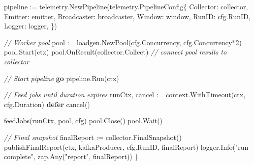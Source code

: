 \documentclass[
]{article}
\newenvironment{Shaded}{}{}
\newcommand{\CommentTok}[1]{\textcolor[rgb]{0.38,0.63,0.69}{\textit{#1}}}
\newcommand{\ControlFlowTok}[1]{\textcolor[rgb]{0.00,0.44,0.13}{\textbf{#1}}}
\newcommand{\DecValTok}[1]{\textcolor[rgb]{0.25,0.63,0.44}{#1}}
\newcommand{\NormalTok}[1]{#1}
\newcommand{\OperatorTok}[1]{\textcolor[rgb]{0.40,0.40,0.40}{#1}}
\newcommand{\StringTok}[1]{\textcolor[rgb]{0.25,0.44,0.63}{#1}}
\begin{document}
\begin{Shaded}
\begin{Highlighting}[]
\NormalTok{    pipeline }\OperatorTok{:=}\NormalTok{ telemetry}\OperatorTok{.}\NormalTok{NewPipeline}\OperatorTok{(}\NormalTok{telemetry}\OperatorTok{.}\NormalTok{PipelineConfig}\OperatorTok{\{}
\NormalTok{        Collector}\OperatorTok{:}\NormalTok{   collector}\OperatorTok{,}
\NormalTok{        Emitter}\OperatorTok{:}\NormalTok{     emitter}\OperatorTok{,}
\NormalTok{        Broadcaster}\OperatorTok{:}\NormalTok{ broadcaster}\OperatorTok{,}
\NormalTok{        Window}\OperatorTok{:}\NormalTok{      window}\OperatorTok{,}
\NormalTok{        RunID}\OperatorTok{:}\NormalTok{       cfg}\OperatorTok{.}\NormalTok{RunID}\OperatorTok{,}
\NormalTok{        Logger}\OperatorTok{:}\NormalTok{      logger}\OperatorTok{,}
    \OperatorTok{\})}

    \CommentTok{// Worker pool}
\NormalTok{    pool }\OperatorTok{:=}\NormalTok{ loadgen}\OperatorTok{.}\NormalTok{NewPool}\OperatorTok{(}\NormalTok{cfg}\OperatorTok{.}\NormalTok{Concurrency}\OperatorTok{,}\NormalTok{ cfg}\OperatorTok{.}\NormalTok{Concurrency}\OperatorTok{*}\DecValTok{2}\OperatorTok{)}
\NormalTok{    pool}\OperatorTok{.}\NormalTok{Start}\OperatorTok{(}\NormalTok{ctx}\OperatorTok{)}
\NormalTok{    pool}\OperatorTok{.}\NormalTok{OnResult}\OperatorTok{(}\NormalTok{collector}\OperatorTok{.}\NormalTok{Collect}\OperatorTok{)} \CommentTok{// connect pool results to collector}

    \CommentTok{// Start pipeline}
    \ControlFlowTok{go}\NormalTok{ pipeline}\OperatorTok{.}\NormalTok{Run}\OperatorTok{(}\NormalTok{ctx}\OperatorTok{)}

    \CommentTok{// Feed jobs until duration expires}
\NormalTok{    runCtx}\OperatorTok{,}\NormalTok{ cancel }\OperatorTok{:=}\NormalTok{ context}\OperatorTok{.}\NormalTok{WithTimeout}\OperatorTok{(}\NormalTok{ctx}\OperatorTok{,}\NormalTok{ cfg}\OperatorTok{.}\NormalTok{Duration}\OperatorTok{)}
    \ControlFlowTok{defer}\NormalTok{ cancel}\OperatorTok{()}

\NormalTok{    feedJobs}\OperatorTok{(}\NormalTok{runCtx}\OperatorTok{,}\NormalTok{ pool}\OperatorTok{,}\NormalTok{ cfg}\OperatorTok{)}
\NormalTok{    pool}\OperatorTok{.}\NormalTok{Close}\OperatorTok{()}
\NormalTok{    pool}\OperatorTok{.}\NormalTok{Wait}\OperatorTok{()}

    \CommentTok{// Final snapshot}
\NormalTok{    finalReport }\OperatorTok{:=}\NormalTok{ collector}\OperatorTok{.}\NormalTok{FinalSnapshot}\OperatorTok{()}
\NormalTok{    publishFinalReport}\OperatorTok{(}\NormalTok{ctx}\OperatorTok{,}\NormalTok{ kafkaProducer}\OperatorTok{,}\NormalTok{ cfg}\OperatorTok{.}\NormalTok{RunID}\OperatorTok{,}\NormalTok{ finalReport}\OperatorTok{)}
\NormalTok{    logger}\OperatorTok{.}\NormalTok{Info}\OperatorTok{(}\StringTok{"run complete"}\OperatorTok{,}\NormalTok{ zap}\OperatorTok{.}\NormalTok{Any}\OperatorTok{(}\StringTok{"report"}\OperatorTok{,}\NormalTok{ finalReport}\OperatorTok{))}
\OperatorTok{\}}
\end{Highlighting}
\end{Shaded}
\end{document}
